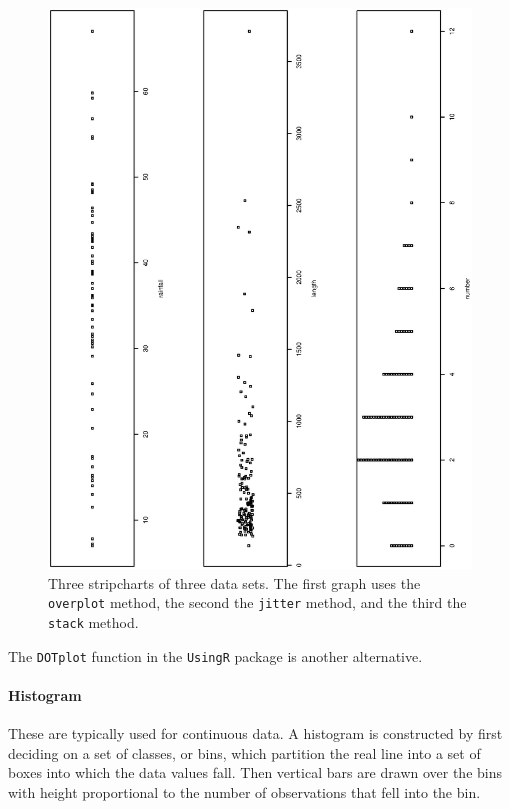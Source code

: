 \documentclass[captions=tableheading]{scrbook}
\begin{document}
  \begin{figure}[th]
    \includegraphics[angle=270, totalheight=4in]{img/stripcharts.ps}
    \caption[Strip charts of \texttt{precip}, \texttt{rivers}, and \texttt{discoveries}]{\small Three stripcharts of three data sets.  The first graph uses the \texttt{overplot} method, the second the \texttt{jitter} method, and the third the \texttt{stack} method.}
    \label{fig:stripcharts}
  \end{figure}


The \texttt{DOTplot} function in the \texttt{UsingR} package \cite{usingr} is another alternative.

\paragraph*{Histogram}

These are typically used for continuous data. A histogram is constructed by first deciding on a set of classes, or bins, which partition the real line into a set of boxes into which the data values fall. Then vertical bars are drawn over the bins with height proportional to the number of observations that fell into the bin. 
\end{document}
